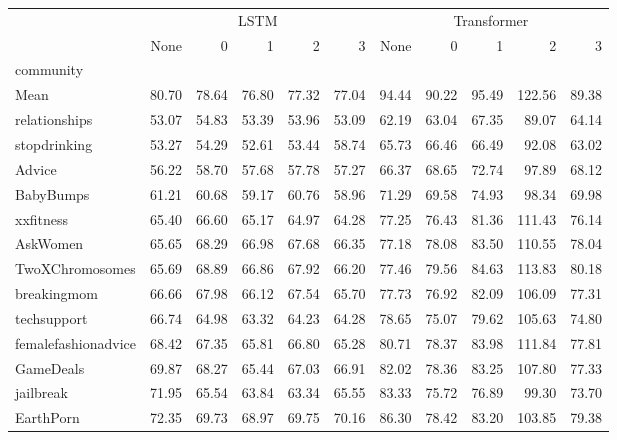 \begin{tabular}{lrrrrrrrrrr}
\toprule
{} & \multicolumn{5}{c}{LSTM} & \multicolumn{5}{c}{Transformer} \\
{} &   None &      0 &      1 &     2 &      3 &        None &      0 &      1 &      2 &      3 \\
community           &        &        &        &       &        &             &        &        &        &        \\
\midrule
Mean                &  80.70 &  78.64 &  76.80 & 77.32 &  77.04 &       94.44 &  90.22 &  95.49 & 122.56 &  89.38 \\
relationships       &  53.07 &  54.83 &  53.39 & 53.96 &  53.09 &       62.19 &  63.04 &  67.35 &  89.07 &  64.14 \\
stopdrinking        &  53.27 &  54.29 &  52.61 & 53.44 &  58.74 &       65.73 &  66.46 &  66.49 &  92.08 &  63.02 \\
Advice              &  56.22 &  58.70 &  57.68 & 57.78 &  57.27 &       66.37 &  68.65 &  72.74 &  97.89 &  68.12 \\
BabyBumps           &  61.21 &  60.68 &  59.17 & 60.76 &  58.96 &       71.29 &  69.58 &  74.93 &  98.34 &  69.98 \\
xxfitness           &  65.40 &  66.60 &  65.17 & 64.97 &  64.28 &       77.25 &  76.43 &  81.36 & 111.43 &  76.14 \\
AskWomen            &  65.65 &  68.29 &  66.98 & 67.68 &  66.35 &       77.18 &  78.08 &  83.50 & 110.55 &  78.04 \\
TwoXChromosomes     &  65.69 &  68.89 &  66.86 & 67.92 &  66.20 &       77.46 &  79.56 &  84.63 & 113.83 &  80.18 \\
breakingmom         &  66.66 &  67.98 &  66.12 & 67.54 &  65.70 &       77.73 &  76.92 &  82.09 & 106.09 &  77.31 \\
techsupport         &  66.74 &  64.98 &  63.32 & 64.23 &  64.28 &       78.65 &  75.07 &  79.62 & 105.63 &  74.80 \\
femalefashionadvice &  68.42 &  67.35 &  65.81 & 66.80 &  65.28 &       80.71 &  78.37 &  83.98 & 111.84 &  77.81 \\
GameDeals           &  69.87 &  68.27 &  65.44 & 67.03 &  66.91 &       82.02 &  78.36 &  83.25 & 107.80 &  77.33 \\
jailbreak           &  71.95 &  65.54 &  63.84 & 63.34 &  65.55 &       83.33 &  75.72 &  76.89 &  99.30 &  73.70 \\
EarthPorn           &  72.35 &  69.73 &  68.97 & 69.75 &  70.16 &       86.30 &  78.42 &  83.20 & 103.85 &  79.38 \\

\end{tabular}
